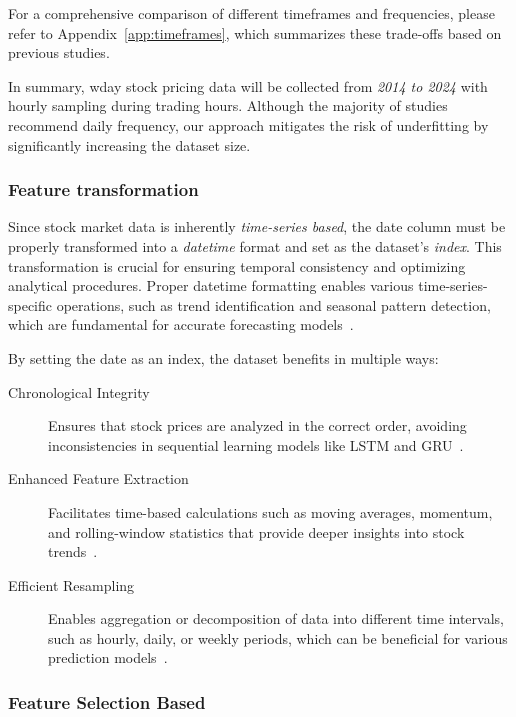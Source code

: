 For a comprehensive comparison of different timeframes and frequencies, please refer to 
Appendix~\ref{app:timeframes}, which summarizes these trade-offs based on previous studies.

In summary, \acrshort{wday} stock pricing data will be collected from \emph{2014 to 2024} with hourly 
sampling during trading hours. Although the majority of studies recommend daily frequency, our 
approach mitigates the risk of underfitting by significantly increasing the dataset size.

\subsubsection{Feature transformation}

Since stock market data is inherently \emph{time-series based}, the date column must be properly transformed 
into a \emph{datetime} format and set as the dataset's \emph{index}. This transformation is crucial for 
ensuring temporal consistency and optimizing analytical procedures. Proper datetime formatting enables 
various time-series-specific operations, such as trend identification and seasonal pattern detection, which 
are fundamental for accurate forecasting models~\parencite{chang2024StockPrediction}.

By setting the date as an index, the dataset benefits in multiple ways:
\begin{description}
    \item[Chronological Integrity] Ensures that stock prices are analyzed in the correct order,
    avoiding inconsistencies in sequential learning models like LSTM and GRU~\parencite{guo2024LSTMStock}.
    \item[Enhanced Feature Extraction] Facilitates time-based calculations such as moving averages, 
    momentum, and rolling-window statistics that provide deeper insights into stock 
    trends~\parencite{shaban2024SMPDL}.
    \item[Efficient Resampling] Enables aggregation or decomposition of data into different time 
    intervals, such as hourly, daily, or weekly periods, which can be beneficial for various prediction 
    models~\parencite{agrawal2022StockPrediction}.
\end{description} 

\subsubsection{Feature Selection Based}

